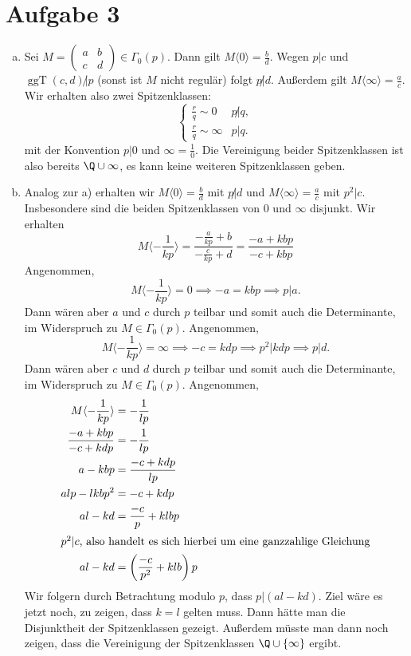 \documentclass{article}
\newcommand{\ggT}{\operatorname{ggT}}
\begin{document}
\section*{Aufgabe 3}
\begin{enumerate}[(a)]
    \item Sei $M = \begin{pmatrix}
        a & b\\c& d
    \end{pmatrix} \in \Gamma_0(p)$.
    Dann gilt $M\langle 0 \rangle = \frac{b}{d}$.
    Wegen $p | c$ und $\ggT(c,d) \not | p$ (sonst ist $M$ nicht regulär) folgt $p \not | d$.
    Außerdem gilt $M\langle \infty \rangle = \frac{a}{c}$.
    Wir erhalten also zwei Spitzenklassen:
    \[
        \begin{cases}
            \frac{r}{q} \sim 0 & p \not | q,\\
            \frac{r}{q} \sim \infty & p | q.
        \end{cases}  
    \]
    mit der Konvention $p | 0$ und $\infty = \frac{1}{0}$.
    Die Vereinigung beider Spitzenklassen ist also bereits $\Q \cup \infty$, es kann keine weiteren Spitzenklassen geben.
    \item Analog zur a) erhalten wir $M\langle 0 \rangle = \frac{b}{d}$ mit $p \not | d$ und $M\langle \infty \rangle = \frac{a}{c}$ mit $p^2|c$. Insbesondere sind die beiden Spitzenklassen von $0$ und $\infty$ disjunkt.
    Wir erhalten
    \[
        M\langle -\frac{1}{kp} \rangle = \frac{-\frac{a}{kp}+b}{-\frac{c}{kp}+d} = \frac{-a + kbp}{-c + kbp}
    \]
    Angenommen, $$M\langle -\frac{1}{kp} \rangle = 0 \implies -a = kbp \implies p | a.$$ Dann wären aber $a$ und $c$ durch $p$ teilbar und somit auch die Determinante, im Widerspruch zu $M \in \Gamma_0(p)$.
    Angenommen, $$M\langle -\frac{1}{kp} \rangle = \infty \implies -c = kdp \implies p^2 | kdp \implies p|d.$$ Dann wären aber $c$ und $d$ durch $p$ teilbar und somit auch die Determinante, im Widerspruch zu $M \in \Gamma_0(p)$.
    Angenommen,
    \begin{align*}
        M\langle -\frac{1}{kp} \rangle &= -\frac{1}{lp}\\
        \frac{-a + kbp}{-c + kdp} &= - \frac{1}{lp}\\
        a - kbp &= \frac{-c + kdp}{lp}\\
        alp - lkbp^2 &= -c + kdp\\
        al - kd &= \frac{-c}{p} + klbp\\
        \intertext{$p^2 | c$, also handelt es sich hierbei um eine ganzzahlige Gleichung}
        al - kd &= \left(\frac{-c}{p^2} + klb\right)p
    \end{align*}
    Wir folgern durch Betrachtung modulo $p$, dass $p | (al - kd)$.
    Ziel wäre es jetzt noch, zu zeigen, dass $k = l$ gelten muss. Dann hätte man die Disjunktheit der Spitzenklassen gezeigt.
    Außerdem müsste man dann noch zeigen, dass die Vereinigung der Spitzenklassen $\Q \cup \{\infty\}$ ergibt.
\end{enumerate}
\end{document}

